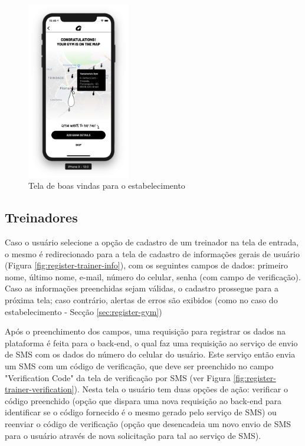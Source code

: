 \begin{figure}[ht]
    \centering
    \includegraphics[width=0.4\textwidth]{pfc/figuras/gym-welcome.png}
    \caption{Tela de boas vindas para o estabelecimento}
    \label{fig:gym-welcome}
\end{figure}

\subsection{Treinadores}
Caso o usuário selecione a opção de cadastro de um treinador na tela de entrada, o mesmo é redirecionado para a tela de cadastro de informações gerais de usuário (Figura \ref{fig:register-trainer-info}), com os seguintes campos de dados: primeiro nome, último nome, e-mail, número do celular, senha (com campo de verificação). Caso as informações preenchidas sejam válidas, o cadastro prossegue para a próxima tela; caso contrário, alertas de erros são exibidos (como no caso do estabelecimento - Secção \ref{sec:register-gym})

Após o preenchimento dos campos, uma requisição para registrar os dados na plataforma é feita para o back-end, o qual faz uma requisição ao serviço de envio de SMS com os dados do número do celular do usuário. Este serviço então envia um SMS com um código de verificação, que deve ser preenchido no campo "Verification Code" da tela de verificação por SMS (ver Figura \ref{fig:register-trainer-verification}). Nesta tela o usuário tem duas opções de ação: verificar o código preenchido (opção que dispara uma nova requisição ao back-end para identificar se o código fornecido é o mesmo gerado pelo serviço de SMS) ou reenviar o código de verificação (opção que desencadeia um novo envio de SMS para o usuário através de nova solicitação para tal ao serviço de SMS).

